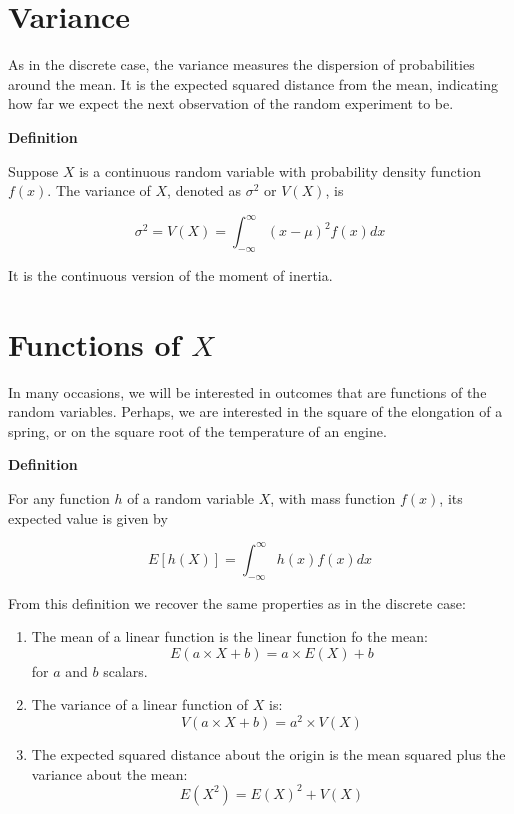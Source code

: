 \documentclass[
]{book}
\begin{document}
\hypertarget{variance-1}{%
\section{Variance}\label{variance-1}}

As in the discrete case, the variance measures the dispersion of probabilities around the mean. It is the expected squared distance from the mean, indicating how far we expect the next observation of the random experiment to be.

\textbf{Definition}

Suppose \(X\) is a continuous random variable with probability density function \(f(x)\). The variance of \(X\), denoted as \(\sigma^2\) or \(V(X)\), is

\[\sigma^2=V(X)=\int_{-\infty}^\infty (x-\mu)^2 f(x) dx\]

It is the continuous version of the moment of inertia.

\hypertarget{functions-of-x}{%
\section{\texorpdfstring{Functions of \(X\)}{Functions of X}}\label{functions-of-x}}

In many occasions, we will be interested in outcomes that are functions of the random variables. Perhaps, we are interested in the square of the elongation of a spring, or on the square root of the temperature of an engine.

\textbf{Definition}

For any function \(h\) of a random variable \(X\), with mass function \(f(x)\), its expected value is given by

\[E[h(X)]= \int_{-\infty}^{\infty} h(x) f(x)dx\]

From this definition we recover the same properties as in the discrete case:

\begin{enumerate}
\def\labelenumi{\arabic{enumi})}
\item
  The mean of a linear function is the linear function fo the mean: \[E(a\times X +b)= a\times E(X) +b\] for \(a\) and \(b\) scalars.
\item
  The variance of a linear function of \(X\) is:\[V(a\times X +b)= a^2\times V(X)\]
\item
  The expected squared distance about the origin is the mean squared plus the variance about the mean: \[E(X^2)=E(X)^2+V(X)\]
\end{enumerate}
\end{document}

